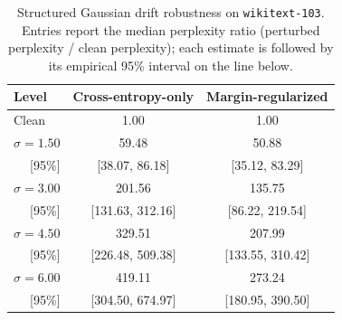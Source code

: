 \documentclass[11pt]{article}
\begin{document}
\begin{table}[H]
\centering
\caption{Structured Gaussian drift robustness on \texttt{wikitext-103}.
Entries report the median perplexity ratio (perturbed perplexity / clean perplexity); each estimate is followed by its empirical 95\% interval on the line below.}
\label{tab:appendix_robustness_wikitext_structured}
\small
\begin{tabular}{lcc}
\toprule
\textbf{Level} & \textbf{Cross-entropy-only} & \textbf{Margin-regularized} \\
\midrule
Clean & 1.00 & 1.00 \\
$\sigma{=}1.50$ & 59.48 & 50.88 \\
\multicolumn{1}{r}{\footnotesize [95\%]} & \footnotesize [38.07, 86.18] & \footnotesize [35.12, 83.29] \\
$\sigma{=}3.00$ & 201.56 & 135.75 \\
\multicolumn{1}{r}{\footnotesize [95\%]} & \footnotesize [131.63, 312.16] & \footnotesize [86.22, 219.54] \\
$\sigma{=}4.50$ & 329.51 & 207.99 \\
\multicolumn{1}{r}{\footnotesize [95\%]} & \footnotesize [226.48, 509.38] & \footnotesize [133.55, 310.42] \\
$\sigma{=}6.00$ & 419.11 & 273.24 \\
\multicolumn{1}{r}{\footnotesize [95\%]} & \footnotesize [304.50, 674.97] & \footnotesize [180.95, 390.50] \\
\bottomrule
\end{tabular}
\end{table}
\end{document}
